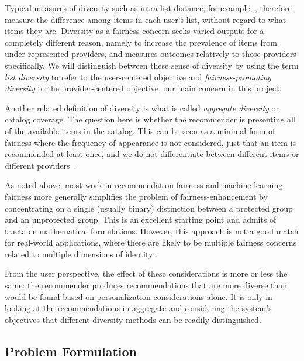 Typical measures of diversity such as intra-list distance, for example, \cite{Ziegler:2005:IRL:1060745.1060754}, therefore measure the difference among items in each user's list, without regard to what items they are. Diversity as a fairness concern seeks varied outputs for a completely different reason, namely to increase the prevalence of items from under-represented providers, and measures outcomes relatively to those providers specifically. We will distinguish between these sense of diversity by using the term \textit{list diversity} to refer to the user-centered objective and \textit{fairness-promoting diversity} to the provider-centered objective, our main concern in this project.

Another related definition of diversity is what is called \textit{aggregate diversity} or catalog coverage. The question here is whether the recommender is presenting all of the available items in the catalog. This can be seen as a minimal form of fairness where the frequency of appearance is not considered, just that an item is recommended at least once, and we do not differentiate between different items or different providers~\cite{adomavicius2011improving}.

As noted above, most work in recommendation fairness and machine learning fairness more generally simplifies the problem of fairness-enhancement by concentrating on a single (usually binary) distinction between a protected group and an unprotected group. This is an excellent starting point and admits of tractable mathematical formulations. However, this approach is not a good match for real-world applications, where there are likely to be multiple fairness concerns related to multiple dimensions of identity \cite{kearns2019empirical}.

From the user perspective, the effect of these considerations is more or less the same: the recommender produces recommendations that are more diverse than would be found based on personalization considerations alone. It is only in looking at the recommendations in aggregate and considering the system's objectives that different diversity methods can be readily distinguished.

\subsection{Problem Formulation}
\label{subsec:ofair_prob_formu}

